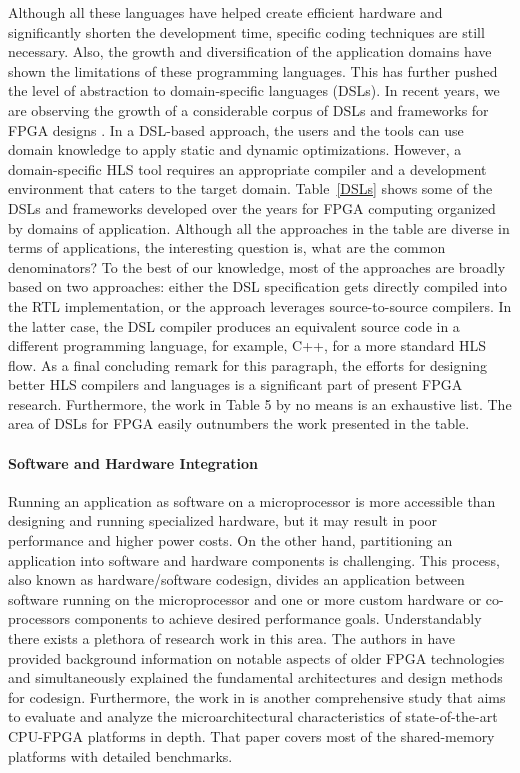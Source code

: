 Although all these languages have helped create efficient hardware and significantly shorten the development time, specific coding techniques are still necessary. Also, the growth and diversification of the application domains have shown the limitations of these programming languages. This has further pushed the level of abstraction to domain-specific languages (DSLs). In recent years, we are observing the growth of a considerable corpus of DSLs and frameworks for FPGA designs \cite{dsl, transparent}. In a DSL-based approach, the users and the tools can use domain knowledge to apply static and dynamic optimizations. However, a domain-specific HLS tool requires an appropriate compiler and a development environment that caters to the target domain. Table~\ref{DSLs} shows some of the DSLs and frameworks developed over the years for FPGA computing organized by domains of application. Although all the approaches in the table are diverse in terms of applications, the interesting question is, what are the common denominators? To the best of our knowledge, most of the approaches are broadly based on two approaches: either the DSL specification gets directly compiled into the RTL implementation, or the approach leverages source-to-source compilers. In the latter case, the DSL compiler produces an equivalent source code in a different programming language, for example, C++, for a more standard HLS flow.   As a final concluding remark for this paragraph, the efforts for designing 
better HLS compilers and languages is a significant part of present FPGA research. Furthermore, the work in Table 5 by no means is an exhaustive list. The area of DSLs for FPGA easily outnumbers the work presented in the table.

\paragraph*{Software and Hardware Integration}

Running an application as software on a microprocessor is more accessible than designing and running specialized hardware, but it may result in poor performance and higher power costs. On the other hand, partitioning an application into software and hardware components is challenging. This process, also known as hardware/software codesign, divides an application between software running on the microprocessor and one or more custom hardware or co-processors components to achieve desired performance goals. Understandably there exists a plethora of research work in this area. The authors in \cite{rfu} have provided background information on notable aspects of older FPGA technologies and simultaneously explained the fundamental architectures and design methods for codesign. Furthermore, the work in \cite{microarchitecture} is another comprehensive study that aims to evaluate and analyze the microarchitectural characteristics of state-of-the-art CPU-FPGA platforms in depth. That paper covers most of the shared-memory platforms with detailed benchmarks.

